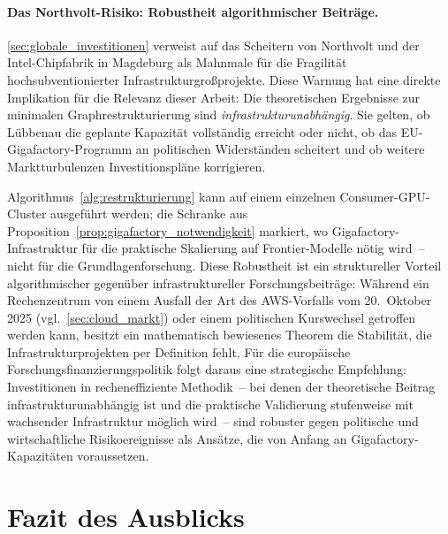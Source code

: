 ﻿\documentclass[12pt, a4paper, openany]{report}
\begin{document}
\paragraph{Das Northvolt-Risiko: Robustheit algorithmischer Beiträge.}
\cref{sec:globale_investitionen} verweist auf das Scheitern von
Northvolt und der Intel-Chipfabrik in Magdeburg als Mahnmale für die
Fragilität hochsubventionierter Infrastrukturgroßprojekte.  Diese
Warnung hat eine direkte Implikation für die Relevanz dieser Arbeit:
Die theoretischen Ergebnisse zur minimalen Graphrestrukturierung sind
\emph{infrastrukturunabhängig}.  Sie gelten, ob Lübbenau die geplante
Kapazität vollständig erreicht oder nicht, ob das EU-Gigafactory-Programm
an politischen Widerständen scheitert und ob weitere Marktturbulenzen
Investitionspläne korrigieren.

Algorithmus~\ref{alg:restrukturierung} kann auf einem einzelnen
Consumer-GPU-Cluster ausgeführt werden; die Schranke aus
Proposition~\ref{prop:gigafactory_notwendigkeit} markiert, wo
Gigafactory-Infrastruktur für die praktische Skalierung auf
Frontier-Modelle nötig wird~-- nicht für die Grundlagenforschung.
Diese Robustheit ist ein struktureller Vorteil algorithmischer
gegenüber infrastruktureller Forschungsbeiträge: Während ein
Rechenzentrum von einem Ausfall der Art des AWS-Vorfalls vom
20.~Oktober 2025 (vgl.\ \cref{sec:cloud_markt}) oder einem
politischen Kurswechsel getroffen werden kann, besitzt ein mathematisch
bewiesenes Theorem die Stabilität, die Infrastrukturprojekten per
Definition fehlt.  Für die europäische Forschungsfinanzierungspolitik
folgt daraus eine strategische Empfehlung: Investitionen in
recheneffiziente Methodik~-- bei denen der theoretische Beitrag
infrastrukturunabhängig ist und die praktische Validierung stufenweise
mit wachsender Infrastruktur möglich wird~-- sind robuster gegen
politische und wirtschaftliche Risikoereignisse als Ansätze, die von
Anfang an Gigafactory-Kapazitäten voraussetzen.

\section*{Fazit des Ausblicks}
\end{document}
